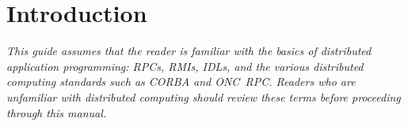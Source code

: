 

\chapter{Introduction}
\label{cha:Introduction}

\emph{This guide assumes that the reader is familiar with the basics of
distributed application programming: RPCs, RMIs, IDLs, and the various
distributed computing standards such as CORBA and ONC~RPC\@.  Readers who are
unfamiliar with distributed computing should review these terms before
proceeding through this manual.}






